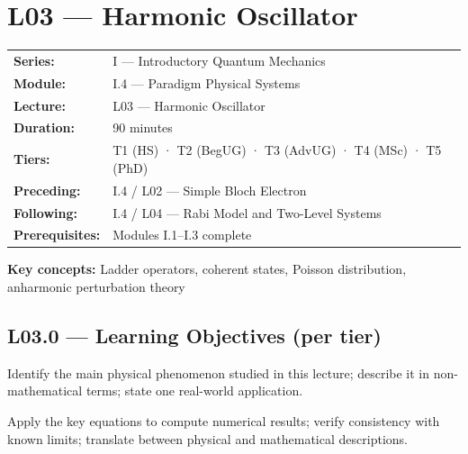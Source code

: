 \renewcommand{\lectureCode}{I.4 / L03}

\section*{L03 — Harmonic Oscillator}
\label{sec:L03}

\begin{tcolorbox}[lecturebox, title={Module I.4 / L03 — Metadata}]
\begin{tabular}{@{}ll@{}}
\textbf{Series:}    & I — Introductory Quantum Mechanics \\
\textbf{Module:}    & I.4 — Paradigm Physical Systems \\
\textbf{Lecture:}   & L03 — Harmonic Oscillator \\
\textbf{Duration:}  & 90 minutes \\
\textbf{Tiers:}     & T1 (HS) · T2 (BegUG) · T3 (AdvUG) · T4 (MSc) · T5 (PhD) \\
\textbf{Preceding:} & I.4 / L02 — Simple Bloch Electron \\
\textbf{Following:} & I.4 / L04 — Rabi Model and Two-Level Systems \\
\textbf{Prerequisites:} & Modules I.1–I.3 complete \\
\end{tabular}

\medskip
\textbf{Key concepts:} Ladder operators, coherent states, Poisson distribution, anharmonic perturbation theory
\end{tcolorbox}

\subsection*{L03.0 — Learning Objectives (per tier)}
\label{sec:L03.0}

\quad
Identify the main physical phenomenon studied in this lecture; describe it in
non-mathematical terms; state one real-world application.

\quad
Apply the key equations to compute numerical results; verify consistency with
known limits; translate between physical and mathematical descriptions.

